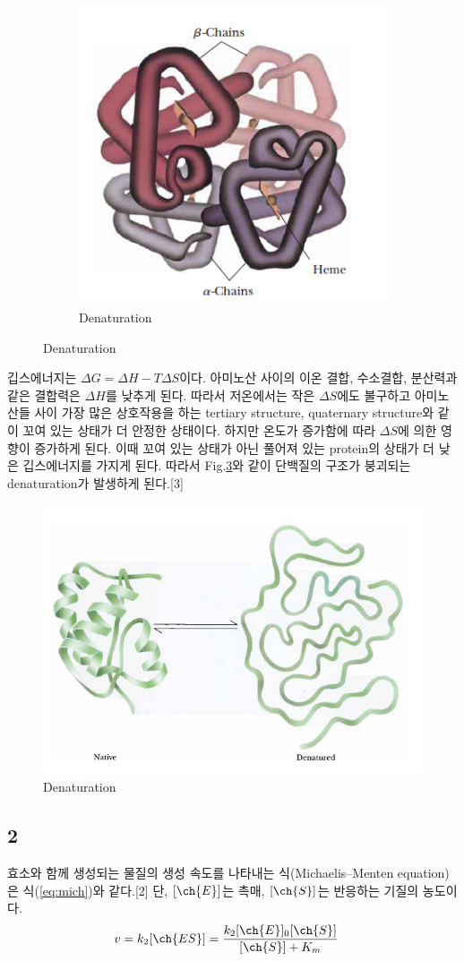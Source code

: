 \documentclass[%
 reprint,
 amsmath,amssymb,
 aps,
]{revtex4-2}
\begin{document}
\begin{figure}[htbp]
	\begin{subfigure}{0.4\textwidth}
		\includegraphics[width = 0.5\linewidth]{Fourth.png}%
		\caption{\label{fig:Fourth}Denaturation}
	\end{subfigure}
	\caption{\label{fig:Protein}Denaturation}
\end{figure}

깁스에너지는 $\Delta G = \Delta H - T \Delta S$이다. 아미노산 사이의 이온 결합, 수소결합, 분산력과 같은 결합력은 $\Delta H$를 낮추게 된다. 따라서 저온에서는 작은 $\Delta S$에도 불구하고 아미노산들 사이 가장 많은 상호작용을 하는 tertiary structure,  quaternary structure와 같이 꼬여 있는 상태가 더 안정한 상태이다. 하지만 온도가 증가함에 따라 $\Delta S$에 의한 영향이 증가하게 된다. 이때 꼬여 있는 상태가 아닌 풀어져 있는 protein의 상태가 더 낮은 깁스에너지를 가지게 된다. 따라서 Fig.\ref{fig:denaturation}와 같이 단백질의 구조가 붕괴되는 denaturation가 발생하게 된다.[3]

\begin{figure}[htbp]
	\includegraphics[width = 0.6\linewidth]{denaturation.png}%
	\caption{\label{fig:denaturation}Denaturation}
\end{figure}

\subsection{\label{sec:level2} 2}
효소와 함께 생성되는 물질의 생성 속도를 나타내는 식(Michaelis–Menten equation)은 식(\ref{eq:mich})와 같다.[2] 단, $[\ch{E}]$는 촉매, $[\ch{S}]$는 반응하는 기질의 농도이다.
\begin{align}
	v &= k_{2}[\ch{ES}] = \frac{k_{2}[\ch{E}]_{0}[\ch{S}]}{[\ch{S}] + K_{m}}\label{eq:mich}
\end{align}
\end{document}
